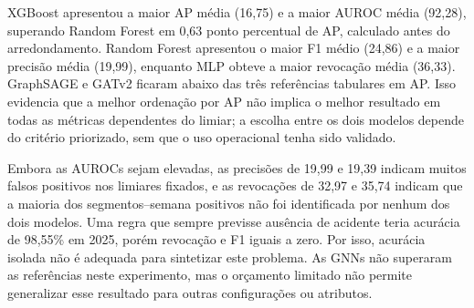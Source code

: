 \documentclass[12pt]{article}
\begin{document}
\begin{table}[!ht]
\centering
\caption{Desempenho em 2025: média $\pm$ desvio-padrão entre cinco
sementes, na escala de 0 a 100.}
\label{tab:modelos-2025}
\small
\setlength{\tabcolsep}{4pt}
\end{table}

XGBoost apresentou a maior AP média (16,75) e a maior AUROC média
(92,28), superando Random Forest em 0,63 ponto percentual de AP,
calculado antes do arredondamento. Random Forest apresentou o maior
F1 médio (24,86) e a maior precisão média (19,99), enquanto MLP
obteve a maior revocação média (36,33). GraphSAGE e GATv2 ficaram abaixo
das três referências tabulares em AP. Isso evidencia que a melhor
ordenação por AP não implica o melhor resultado em todas as métricas
dependentes do limiar; a escolha entre os dois modelos depende do
critério priorizado, sem que o uso operacional tenha sido validado.

Embora as AUROCs sejam elevadas, as precisões de 19,99 e 19,39
indicam muitos falsos positivos nos limiares fixados, e as revocações
de 32,97 e 35,74 indicam que a maioria dos segmentos--semana positivos
não foi identificada por nenhum dos dois modelos. Uma regra que sempre
previsse ausência de acidente teria acurácia de 98,55\% em 2025, porém
revocação e F1 iguais a zero. Por isso, acurácia isolada não é
adequada para sintetizar este problema. As GNNs não superaram as
referências neste experimento, mas o orçamento limitado não permite
generalizar esse resultado para outras configurações ou atributos.
\end{document}
